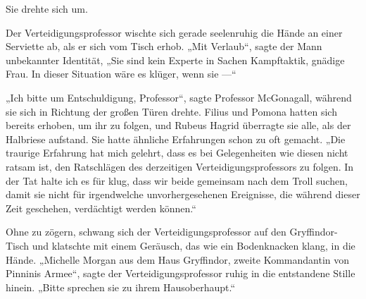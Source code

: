 Sie drehte sich um.

Der Verteidigungsprofessor wischte sich gerade seelenruhig die Hände an einer Serviette ab, als er sich vom Tisch erhob.
„Mit Verlaub“, sagte der Mann unbekannter Identität,
„Sie sind kein Experte in Sachen Kampftaktik, gnädige Frau. In dieser Situation wäre es klüger, wenn sie —“

„Ich bitte um Entschuldigung, Professor“, sagte Professor McGonagall, während sie sich in Richtung der großen Türen drehte. Filius und Pomona hatten sich bereits erhoben, um ihr zu folgen, und Rubeus Hagrid überragte sie alle, als der Halbriese aufstand. Sie hatte ähnliche Erfahrungen schon zu oft gemacht.
„Die traurige Erfahrung hat mich gelehrt, dass es bei Gelegenheiten wie diesen nicht ratsam ist, den Ratschlägen des derzeitigen Verteidigungsprofessors zu folgen. In der Tat halte ich es für klug, dass wir beide gemeinsam nach dem Troll suchen, damit sie nicht für irgendwelche unvorhergesehenen Ereignisse, die während dieser Zeit geschehen, verdächtigt werden können.“


Ohne zu zögern, schwang sich der Verteidigungsprofessor auf den Gryffindor-Tisch und klatschte mit einem Geräusch, das wie ein Bodenknacken klang, in die Hände.
„Michelle Morgan aus dem Haus Gryffindor, zweite Kommandantin von Pinninis Armee“, sagte der Verteidigungsprofessor ruhig in die entstandene Stille hinein.
„Bitte sprechen sie zu ihrem Hausoberhaupt.“

